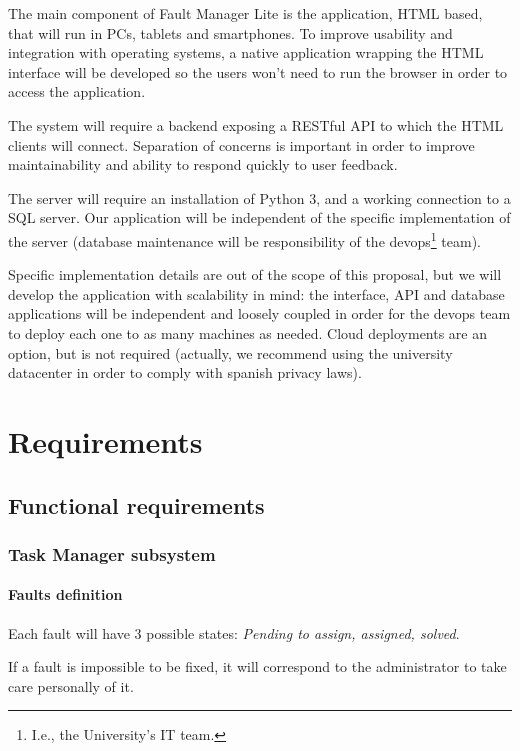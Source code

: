 The main component of Fault Manager Lite is the application, HTML based, that will run in PCs, tablets and smartphones. To improve usability and integration with operating systems, a native application wrapping the HTML interface will be developed so the users won't need to run the browser in order to access the application.

The system will require a backend exposing a RESTful API to which the HTML clients will connect. Separation of concerns is important in order to improve maintainability and ability to respond quickly to user feedback.

The server will require an installation of Python 3, and a working connection to a SQL server. Our application will be independent of the specific implementation of the server (database maintenance will be responsibility of the devops\footnote{I.e., the University's IT team.} team).

Specific implementation details are out of the scope of this proposal, but we will develop the application with scalability in mind: the interface, API and database applications will be independent and loosely coupled in order for the devops team to deploy each one to as many machines as needed. Cloud deployments are an option, but is not required (actually, we recommend using the university datacenter in order to comply with spanish privacy laws).

\section{Requirements}

\subsection{Functional requirements}

\subsubsection{Task Manager subsystem}

\paragraph{Faults definition} Each fault will have 3 possible states: \textit{Pending to assign, assigned, solved}.

If a fault is impossible to be fixed, it will correspond to the administrator to take care personally of it.


